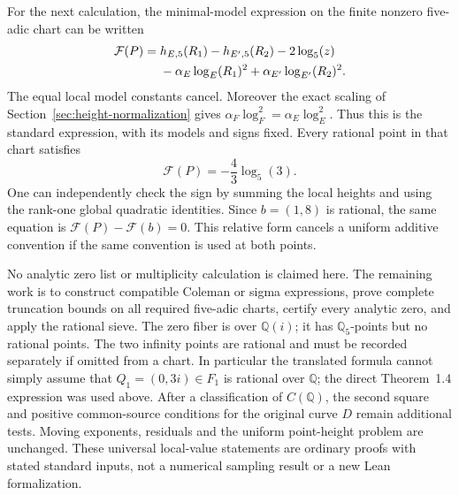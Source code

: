 For the next calculation, the minimal-model expression on the finite
nonzero five-adic chart can be written
\begin{align}
 \mathcal F(P)
  ={}&h_{E,5}(R_1)-h_{E',5}(R_2)-2\log_5(z)\notag\\
    &-\alpha_E\log_E(R_1)^2
      +\alpha_{E'}\log_{E'}(R_2)^2.
 \label{lh-five-equation}
\end{align}
The equal local model constants cancel. Moreover the exact scaling of
Section~\ref{sec:height-normalization} gives
\(\alpha_F\log_F^2=\alpha_E\log_E^2\).
Thus this is the standard expression, with its models and signs fixed.
Every rational point in that chart satisfies
\[
 \mathcal F(P)=-\frac43\log_5(3).
\]
One can independently check the sign by summing the local heights
and using the rank-one global quadratic identities.
Since \(b=(1,8)\) is rational, the same equation is
\(\mathcal F(P)-\mathcal F(b)=0\). This relative form cancels a
uniform additive convention if the same convention is used at both
points.

No analytic zero list or multiplicity calculation is claimed here.
The remaining work is to construct compatible Coleman or sigma
expressions, prove complete truncation bounds on all required
five-adic charts, certify every analytic zero, and apply the rational
sieve. The zero fiber is over \(\mathbb Q(i)\); it has
\(\mathbb Q_5\)-points but no rational points. The two infinity points
are rational and must be recorded separately if omitted from a chart.
In particular the translated formula cannot simply assume that
\(Q_1=(0,3i)\in F_1\) is rational over \(\mathbb Q\); the direct
Theorem~1.4 expression was used above.
After a classification of \(C(\mathbb Q)\), the second square and
positive common-source conditions for the original curve \(D\)
remain additional tests. Moving exponents, residuals and the uniform
point-height problem are unchanged. These universal local-value
statements are ordinary proofs with stated standard inputs, not
a numerical sampling result or a new Lean formalization.
